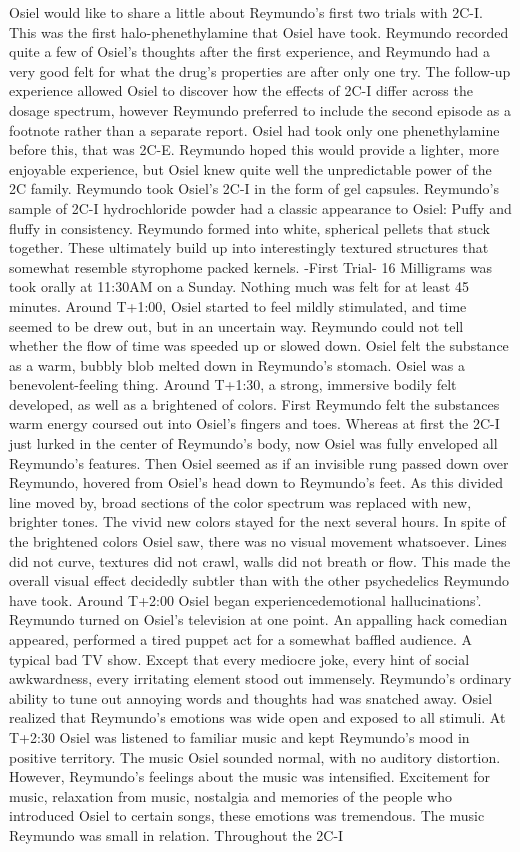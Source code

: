 \documentclass[12pt]{book}
\begin{document}
Osiel would like to share a little about Reymundo's first two trials with 2C-I. This was the first halo-phenethylamine that Osiel have took. Reymundo recorded quite a few of Osiel's thoughts after the first experience, and Reymundo had a very good felt for what the drug's properties are after only one try. The follow-up experience allowed Osiel to discover how the effects of 2C-I differ across the dosage spectrum, however Reymundo preferred to include the second episode as a footnote rather than a separate report. Osiel had took only one phenethylamine before this, that was 2C-E. Reymundo hoped this would provide a lighter, more enjoyable experience, but Osiel knew quite well the unpredictable power of the 2C family. Reymundo took Osiel's 2C-I in the form of gel capsules. Reymundo's sample of 2C-I hydrochloride powder had a classic appearance to Osiel: Puffy and fluffy in consistency. Reymundo formed into white, spherical pellets that stuck together. These ultimately build up into interestingly textured structures that somewhat resemble styrophome packed kernels. -First Trial- 16 Milligrams was took orally at 11:30AM on a Sunday. Nothing much was felt for at least 45 minutes. Around T+1:00, Osiel started to feel mildly stimulated, and time seemed to be drew out, but in an uncertain way. Reymundo could not tell whether the flow of time was speeded up or slowed down. Osiel felt the substance as a warm, bubbly blob melted down in Reymundo's stomach. Osiel was a benevolent-feeling thing. Around T+1:30, a strong, immersive bodily felt developed, as well as a brightened of colors. First Reymundo felt the substances warm energy coursed out into Osiel's fingers and toes. Whereas at first the 2C-I just lurked in the center of Reymundo's body, now Osiel was fully enveloped all Reymundo's features. Then Osiel seemed as if an invisible rung passed down over Reymundo, hovered from Osiel's head down to Reymundo's feet. As this divided line moved by, broad sections of the color spectrum was replaced with new, brighter tones. The vivid new colors stayed for the next several hours. In spite of the brightened colors Osiel saw, there was no visual movement whatsoever. Lines did not curve, textures did not crawl, walls did not breath or flow. This made the overall visual effect decidedly subtler than with the other psychedelics Reymundo have took. Around T+2:00 Osiel began experiencedemotional hallucinations'. Reymundo turned on Osiel's television at one point. An appalling hack comedian appeared, performed a tired puppet act for a somewhat baffled audience. A typical bad TV show. Except that every mediocre joke, every hint of social awkwardness, every irritating element stood out immensely. Reymundo's ordinary ability to tune out annoying words and thoughts had was snatched away. Osiel realized that Reymundo's emotions was wide open and exposed to all stimuli. At T+2:30 Osiel was listened to familiar music and kept Reymundo's mood in positive territory. The music Osiel sounded normal, with no auditory distortion. However, Reymundo's feelings about the music was intensified. Excitement for music, relaxation from music, nostalgia and memories of the people who introduced Osiel to certain songs, these emotions was tremendous. The music Reymundo was small in relation. Throughout the 2C-I 
\end{document}
